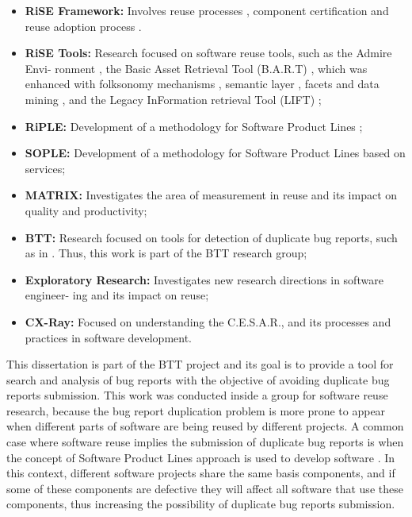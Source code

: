 \begin{itemize}
  \item \textbf{RiSE Framework:} Involves reuse processes
  \citep{Almeida2004,Nascimento2008}, component certification
  \citep{Alvaro2006} and reuse adoption process \citep{Garcia2008a}.
  
   \item \textbf{RiSE Tools:} Research focused on software reuse tools, such
   as the Admire Envi- ronment \citep{Mascena2006}, the Basic Asset Retrieval
   Tool (B.A.R.T) \citep{Santos2006}, which was enhanced with folksonomy
   mechanisms \citep{Vanderlei2007}, semantic layer \citep{Durao2008},
   facets \citep{Mendes2008} and data mining \citep{Martins2008}, and the
   Legacy InFormation retrieval Tool (LIFT) \citep{Brito2007};
   
   \item \textbf{RiPLE:} Development of a methodology for Software Product
   Lines \citep{Filho2008};
   
   \item \textbf{SOPLE:} Development of a methodology for Software Product
   Lines based on services;
   
   \item \textbf{MATRIX:} Investigates the area of measurement in reuse and
   its impact on quality and productivity;
   
   \item \textbf{BTT:} Research focused on tools for detection of duplicate
   bug reports, such as in \citet{CavalcantiFISL2008}. Thus, this work is part
   of the BTT research group;
   
   \item \textbf{Exploratory Research:} Investigates new research directions
   in software engineer- ing and its impact on reuse;

   \item \textbf{CX-Ray:} Focused on understanding the \ac{C.E.S.A.R.}, and its
   processes and practices in software development.
\end{itemize}

This dissertation is part of the \ac{BTT} project and its goal is to
provide a tool for search and analysis of bug reports with the objective of
avoiding duplicate bug reports submission. This work was conducted inside a
group for software reuse research, because the bug report duplication problem
is more prone to appear when different parts of software are being reused by
different projects. A common case where software reuse implies the submission
of duplicate bug reports is when the concept of Software Product Lines
\citep{Pohl2005} approach is used to develop software \citep{Runeson2007}. In
this context, different software projects share the same basis components, and
if some of these components are defective they will affect all software that
use these components, thus increasing the possibility of duplicate bug
reports submission.

